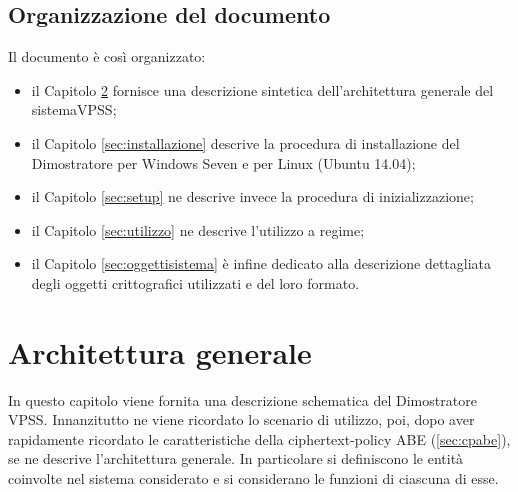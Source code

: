 \documentclass[a4paper,twoside,10pt,openany]{scrbook}
\begin{document}
\section{Organizzazione del documento}
Il documento è così organizzato:
\begin{itemize}
 \item il Capitolo \ref{sec:archgen} fornisce una descrizione sintetica dell'architettura generale del sistema\ac{VPSS};
 \item il Capitolo \ref{sec:installazione} descrive la procedura di installazione del Dimostratore per Windows Seven e per Linux (Ubuntu 14.04);
 \item il Capitolo \ref{sec:setup} ne descrive invece la procedura di inizializzazione;
 \item il Capitolo \ref{sec:utilizzo} ne descrive l'utilizzo a regime;
 \item il Capitolo \ref{sec:oggettisistema} è infine dedicato alla descrizione dettagliata degli oggetti crittografici utilizzati e del loro formato.
\end{itemize}
%
%
%
\chapter{Architettura generale}\label{sec:archgen}
In questo capitolo viene fornita una descrizione schematica del Dimostratore VPSS. Innanzitutto ne viene ricordato lo scenario di utilizzo, poi, dopo aver rapidamente ricordato le caratteristiche della ciphertext-policy \ac{ABE} (\ref{sec:cpabe}), se ne descrive l'architettura generale. In particolare si definiscono le entità coinvolte nel sistema considerato e si considerano le funzioni di ciascuna di esse.
%
\end{document}
